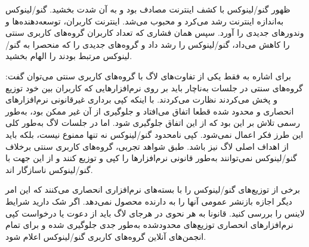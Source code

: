 ظهور گنو/لینوکس با کشف اینترنت مصادف بود و به آن شدت بخشید.
گنو/لینوکس به‌اندازه اینترنت رشد می‌کرد و محبوب می‌شد.
اینترنت کاربران، توسعه‌دهنده‌ها و وندورهای جدیدی را آورد.
سپس همان فشاری که تعداد کاربران گروه‌های کاربری سنتی را کاهش می‌داد،
گنو/لینوکس را رشد داد و گروه‌های جدیدی را که منحصرا به گنو/لینوکس مرتبط بودند
را الهام بخشید.

برای اشاره به فقط یکی از تفاوت‌های لاگ با گروه‌های کاربری سنتی می‌توان گفت:
گروه‌های سنتی در جلسات به‌ناچار باید بر روی نرم‌افزارهایی که کاربران بین خود
توزیع و پخش می‌کردند نظارت می‌کردند. با اینکه کپی برداری غیرقانونی نرم‌افزارهای
انحصاری و محدود شده قطعا اتفاق می‌افتاد و جلوگیری از آن غیر ممکن بود، به‌طور رسمی
تلاش بر این بود که از این اتفاق جلوگیری شود.
اما در جلسات لاگ به‌طور کلی این طرز فکر اعمال نمی‌شود. کپی نامحدود گنو/لینوکس نه تنها ممنوع نیست،
بلکه باید از اهداف اصلی لاگ نیز باشد. طبق شواهد تجربی، گروه‌های کاربری سنتی برخلاف گنو/لینوکس
نمی‌توانند به‌طور قانونی نرم‌افزار‌ها را کپی و توزیع کنند و از این جهت با گنو/لینوکس ناسازگار اند.


\begin{caveat}
برخی از توزیع‌های گنو/لینوکس را با بسته‌های نرم‌افزاری انحصاری
می‌کنند که این امر
دیگر اجازه بازنشر عمومی آنها را به دارنده محصول نمی‌دهد. اگر شک دارید شرایط لاینس را بررسی کنید.
قانونا به هر نحوی در هرجای لاگ باید از دعوت یا درخواست کپی نرم‌افزارهای انحصاری توزیع‌های محدودشده
 به‌طور جدی جلوگیری شده و برای تمام انجمن‌های آنلاین گروه‌های کاربری گنو/لینوکس
اعلام شود.
\end{caveat}




